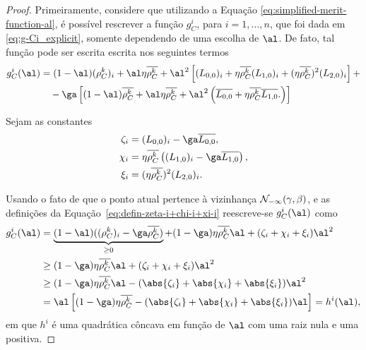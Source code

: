 \begin{proof}
 Primeiramente, considere que  utilizando a Equação \eqref{eq:simplified-merit-function-al}, é possível rescrever a função $g_C^i $, para $i=1,\ldots,n$, que foi dada em \eqref{eq:g-Ci_explicit}, somente dependendo de uma escolha de $\al$. De fato, tal função pode ser escrita escrita nos seguintes termos
\[
\begin{aligned}
{g}_C^i (\al)				& = (1-\al)(\rho_C^k )_i+ \al\eta\rhoCkb + \al^2\left[(L_{0,0})_i + \eta\rhoCkb  ({L_{1,0}})_i 
				+ (\eta\rhoCkb )^2(L_{2,0})_i \right]  + \\
				& \quad -\ga\left[  (1-\al)\rhoCkb  + \al\eta\rhoCkb  + \al^2\left(\dbvec{L_{0,0}} + \eta\rhoCkb  \dbvec{L_{1,0}}.
\right)  \right]
\end{aligned}
\]

Sejam as constantes
\begin{equation}
\label{eq:defin-zeta-i+chi-i+xi-i}
	\begin{aligned}
\zeta_i & = (L_{0,0})_i - \ga \dbvec{L_{0,0}}, \\
\chi_i  & = \eta\rhoCkb  \left( ({L_{1,0}})_i - \ga\dbvec{L_{1,0}} \right),   \\
\xi_i	& =  (\eta\rhoCkb )^2(L_{2,0})_i . \\ 	
\end{aligned}
\end{equation}



Usando o fato de que o ponto atual pertence à vizinhança $\mathcal{N}_{-\infty}(\gamma,\beta)$, e as definições da Equação~\eqref{eq:defin-zeta-i+chi-i+xi-i} reescreve-se  $g_C^i(\al) $ como
\[
\begin{aligned}
	g_C^i (\al) & = \underbrace{(1-\al)((\rho_C^k )_i - \ga\rhoCkb )}_{\geq 0}  + (1-\ga)\eta\rhoCkb  \al+  (\zeta_i + 				\chi_i + \xi_i)\al^2  \\
				& \geq (1-\ga)\eta\rhoCkb  \al +  (\zeta_i + 				\chi_i + \xi_i)\al^2 \\ 
				& \geq (1-\ga)\eta\rhoCkb  \al -  (\abs{\zeta_i} + \abs{\chi_i} + \abs{\xi_i})\al^2 \\
				& = \al \left[	(1-\ga)\eta\rhoCkb   -  (\abs{\zeta_i} + \abs{\chi_i} + \abs{\xi_i})\al	\right] = h^i(\al),
\end{aligned}
\]
em que $h^i$ é uma quadrática côncava em função de $\al$ com uma raiz nula e uma positiva. 


\end{proof}

